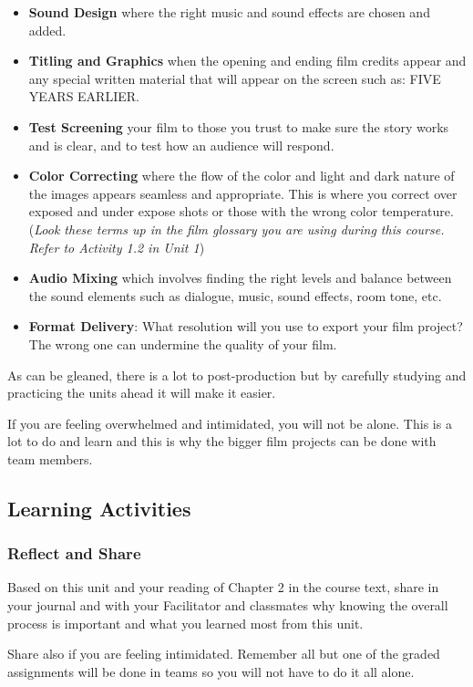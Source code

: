 \documentclass[
]{book}
\begin{document}
\begin{itemize}
\item
  \textbf{Sound Design} where the right music and sound effects are chosen and added.
\item
  \textbf{Titling and Graphics} when the opening and ending film credits appear and any special written material that will appear on the screen such as: FIVE YEARS EARLIER.
\item
  \textbf{Test Screening} your film to those you trust to make sure the story works and is clear, and to test how an audience will respond.
\item
  \textbf{Color Correcting} where the flow of the color and light and dark nature of the images appears seamless and appropriate. This is where you correct over exposed and under expose shots or those with the wrong color temperature. (\emph{Look these terms up in the film glossary you are using during this course. Refer to Activity 1.2 in Unit 1})
\item
  \textbf{Audio Mixing} which involves finding the right levels and balance between the sound elements such as dialogue, music, sound effects, room tone, etc.
\item
  \textbf{Format Delivery}: What resolution will you use to export your film project? The wrong one can undermine the quality of your film.
\end{itemize}

As can be gleaned, there is a lot to post-production but by carefully studying and practicing the units ahead it will make it easier.

If you are feeling overwhelmed and intimidated, you will not be alone. This is a lot to do and learn and this is why the bigger film projects can be done with team members.

\hypertarget{learning-activities-8}{%
\subsection*{Learning Activities}\label{learning-activities-8}}

\begin{assessment}
\hypertarget{reflect-and-share}{%
\subsubsection*{Reflect and Share}\label{reflect-and-share}}

Based on this unit and your reading of Chapter 2 in the course text, share in your journal and with your Facilitator and classmates why knowing the overall process is important and what you learned most from this unit.

Share also if you are feeling intimidated. Remember all but one of the graded assignments will be done in teams so you will not have to do it all alone.
\end{assessment}
\end{document}

